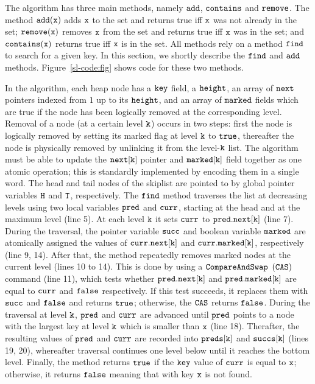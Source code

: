 The algorithm has three main methods, namely $\tt add$, $\tt contains$ and $\tt remove$. The method $\tt add(x)$ adds $\tt x$ to the set and returns true iff $\tt x$ was not already in the set; $\tt remove(x)$ removes $\tt x$ from the set and returns true iff ${\tt x}$ was in the set; and $\tt contains(x)$
returns true iff $\tt x$ is in the set.
All methods rely on a method $\tt find$ to search for a given key. 
In this section, we shortly describe the $\tt find$ and $\tt add$ methods.
Figure~\ref{sl-code:fig} shows code for these two methods.




In the algorithm, each heap node has a $\tt key$ field, a $\tt height$, an array of $\tt next$ pointers indexed from
$1$ up to its $\tt height$, and an array of $\tt marked$ fields which are true if the node has been logically removed at the corresponding level. Removal of a node (at a certain level ${\tt k}$) occurs in two steps: first the node is logically removed by setting its marked flag at level ${\tt k}$ to $\tt true$, thereafter the node is physically removed by unlinking it from the level-${\tt k}$ list. The algorithm must be able to update the $\tt next[k]$ pointer and $\tt marked[k]$ field together as one atomic operation; this is standardly implemented by encoding them in a single word. The head and tail nodes of the skiplist are pointed to by global pointer variables $\tt H$ and $\tt T$, respectively. The $\tt find$ method traverses the list at decreasing levels using two local variables $\tt pred$ and $\tt curr$, starting at the head and at 
the maximum level (line 5). At each level $\tt k$ it sets $\tt curr$ to $\tt pred.next[k]$ (line 7). During the traversal, the pointer variable $\tt succ$ and boolean variable $\tt marked$ are atomically assigned the values of $\tt curr.next[k]$ and $\tt curr.marked[k]$, respectively (line 9, 14). After that, the method repeatedly removes marked nodes at the current level (lines 10 to 14). This is done by using a $\tt CompareAndSwap$ $\tt (CAS)$ command (line 11), which tests whether $\tt pred.next[k]$ and $\tt pred.marked[k]$ are equal to $\tt curr$ and $\tt false$ respectively. If this test succeeds, it replaces them with $\tt succ$ and $\tt false$ and returns $\tt true$; otherwise, the $\tt CAS$ returns $\tt false$. During the traversal at level $\tt k$, $\tt pred$ and $\tt curr$ are advanced until $\tt pred$ points to a node with the largest key at level $\tt k$ which is smaller than $\tt x$ (line 18). Therafter, the resulting values of $\tt pred$ and $\tt curr$ are recorded into $\tt preds[k]$ and $\tt succs[k]$ (lines 19, 20), whereafter traversal continues one level below until it reaches the bottom level. Finally, the
method returns $\tt true$ if the $\tt key$ value of $\tt curr$ is equal to $\tt x$; otherwise, it returns $\tt false$ meaning that with key $\tt x$ is not found.



